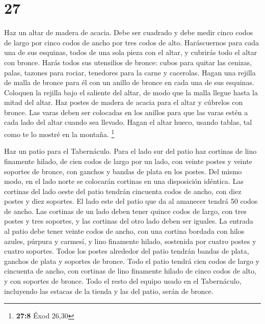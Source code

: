 \hypertarget{section-26}{%
\section{27}\label{section-26}}

 Haz un altar de madera de acacia. Debe ser cuadrado y
debe medir cinco codos de largo por cinco codos de ancho por tres codos
de alto.  Haráscuernos para cada una de sus esquinas,
todos de una sola pieza con el altar, y cubrirás todo el altar con
bronce.  Harás todos sus utensilios de bronce: cubos para
quitar las cenizas, palas, tazones para rociar, tenedores para la carne
y cacerolas.  Hagan una rejilla de malla de bronce para él
con un anillo de bronce en cada una de sus esquinas. 
Coloquen la rejilla bajo el saliente del altar, de modo que la malla
llegue hasta la mitad del altar.  Haz postes de madera de
acacia para el altar y cúbrelos con bronce.  Las varas
deben ser colocadas en los anillos para que las varas estén a cada lado
del altar cuando sea llevado.  Hagan el altar hueco,
usando tablas, tal como te lo mostré en la montaña. \footnote{\textbf{27:8}
  Éxod 26,30}

 Haz un patio para el Tabernáculo. Para el lado sur del
patio haz cortinas de lino finamente hilado, de cien codos de largo por
un lado,  con veinte postes y veinte soportes de bronce,
con ganchos y bandas de plata en los postes.  Del mismo
modo, en el lado norte se colocarán cortinas en una disposición
idéntica.  Las cortinas del lado oeste del patio tendrán
cincuenta codos de ancho, con diez postes y diez soportes.
 El lado este del patio que da al amanecer tendrá 50
codos de ancho.  Las cortinas de un lado deben tener
quince codos de largo, con tres postes y tres soportes, 
y las cortinas del otro lado deben ser iguales.  La
entrada al patio debe tener veinte codos de ancho, con una cortina
bordada con hilos azules, púrpura y carmesí, y lino finamente hilado,
sostenida por cuatro postes y cuatro soportes.  Todos los
postes alrededor del patio tendrán bandas de plata, ganchos de plata y
soportes de bronce.  Todo el patio tendrá cien codos de
largo y cincuenta de ancho, con cortinas de lino finamente hilado de
cinco codos de alto, y con soportes de bronce.  Todo el
resto del equipo usado en el Tabernáculo, incluyendo las estacas de la
tienda y las del patio, serán de bronce.

